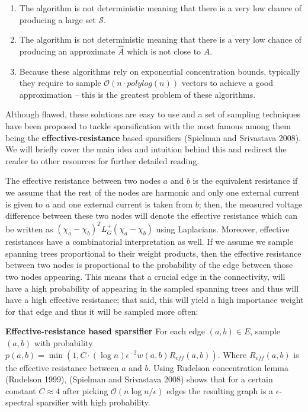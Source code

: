 \documentclass[
  letterpaper,
  DIV=11,
  numbers=noendperiod]{scrartcl}
\providecommand{\tightlist}{%
  \setlength{\itemsep}{0pt}\setlength{\parskip}{0pt}}\usepackage{longtable,booktabs,array}
\theoremstyle{plain}
\theoremstyle{plain}
\theoremstyle{plain}
\theoremstyle{definition}
\theoremstyle{plain}
\theoremstyle{remark}
\begin{document}
\begin{enumerate}
\def\labelenumi{\arabic{enumi}.}
\tightlist
\item
  The algorithm is not deterministic meaning that there is a very low
  chance of producing a large set \(\mathcal{S}\).
\item
  The algorithm is not deterministic meaning that there is a very low
  chance of producing an approximate \(\hat{A}\) which is not close to
  \(A\).
\item
  Because these algorithms rely on exponential concentration bounds,
  typically they require to sample \(\mathcal{O}(n \cdot polylog(n))\)
  vectors to achieve a good approximation -- this is the greatest
  problem of these algorithms.
\end{enumerate}

Although flawed, these solutions are easy to use and a set of sampling
techniques have been proposed to tackle sparsification with the most
famous among them being the \textbf{effective-resistance} based
sparsifiers (Spielman and Srivastava 2008). We will briefly cover the
main idea and intuition behind this and redirect the reader to other
resources for further detailed reading.

The effective resistance between two nodes \(a\) and \(b\) is the
equivalent resistance if we assume that the rest of the nodes are
harmonic and only one external current is given to \(a\) and one
external current is taken from \(b\); then, the measured voltage
difference between these two nodes will denote the effective resistance
which can be written as \((\chi_a - \chi_b)^T L^+_G (\chi_a - \chi_b)\)
using Laplacians. Moreover, effective resistances have a combinatorial
interpretation as well. If we assume we sample spanning trees
proportional to their weight products, then the effective resistance
between two nodes is proportional to the probability of the edge between
those two nodes appearing. This means that a crucial edge in the
connectivity, will have a high probability of appearing in the sampled
spanning trees and thus will have a high effective resistance; that
said, this will yield a high importance weight for that edge and thus it
will be sampled more often:

\textbf{Effective-resistance based sparsifier} For each edge
\((a, b) \in E\), sample \((a,b)\) with probability
\(p(a,b) = \min\left(1, C \cdot (\log n) \epsilon^{-2} w(a,b) R_{eff}(a, b)\right)\).
Where \(R_{eff}(a, b)\) is the effective resistance between \(a\) and
\(b\). Using Rudelson concentration lemma (Rudelson 1999), (Spielman and
Srivastava 2008) shows that for a certain constant \(C \approx 4\) after
picking \(\mathcal{O}(n\log n /\epsilon)\) edges the resulting graph is
a \(\epsilon\)-spectral sparsifier with high probability.
\end{document}

